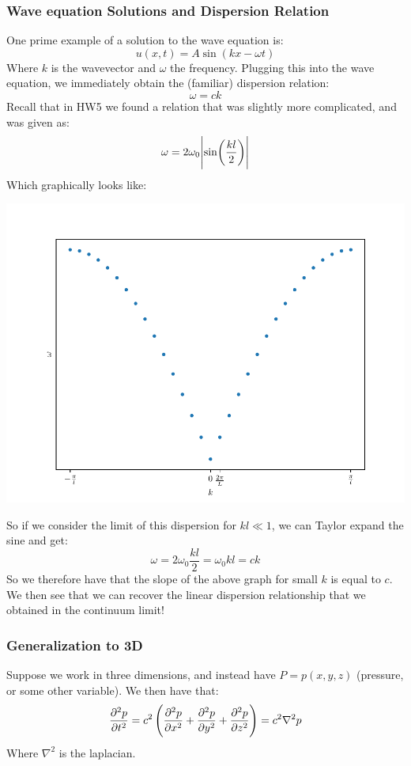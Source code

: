 \subsubsection{Wave equation Solutions and Dispersion Relation}
One prime example of a solution to the wave equation is:
\[u(x, t) = A\sin(kx - \omega t)\]
Where $k$ is the wavevector and $\omega$ the frequency. Plugging this into the wave equation, we immediately obtain the (familiar) dispersion relation:
\[\omega = ck\]
Recall that in HW5 we found a relation that was slightly more complicated, and was given as:
\[\omega = 2\omega_0\abs{\sin(\frac{kl}{2})}\]
Which graphically looks like:
\begin{center}
    \includegraphics[scale=0.8]{Lecture-30/l30-img3.pdf}
\end{center}
So if we consider the limit of this dispersion for $kl \ll 1$, we can Taylor expand the sine and get:
\[\omega = 2\omega_0 \frac{kl}{2} = \omega_0 kl = ck\]
So we therefore have that the slope of the above graph for small $k$ is equal to $c$. We then see that we can recover the linear dispersion relationship that we obtained in the continuum limit!

\subsubsection{Generalization to 3D}
Suppose we work in three dimensions, and instead have $P = p(x, y, z)$ (pressure, or some other variable). We then have that:
\[\dpd[2]{p}{t} = c^2\left(\dpd[2]{p}{x} + \dpd[2]{p}{y} + \dpd[2]{p}{z}\right) = c^2\nabla^2 p\]
Where $\nabla^2$ is the laplacian.

